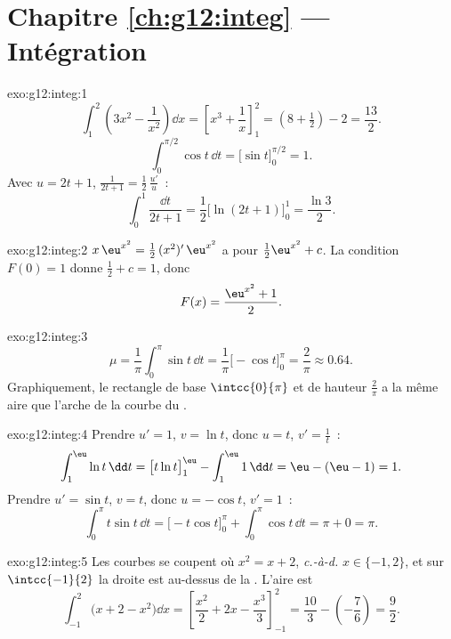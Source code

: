 \section*{Chapitre \ref{ch:g12:integ} --- Intégration}

\begin{solution}{exo:g12:integ:1}
\[
\int_1^2 \left(3x^2 - \frac{1}{x^2}\right)\dd x
= \left[x^3 + \frac1x\right]_1^2 = \left(8 + \tfrac12\right) - 2 = \frac{13}{2}.
\]
\[
\int_0^{\pi/2} \cos t\,\dd t = \bigl[\sin t\bigr]_0^{\pi/2} = 1 .
\]
Avec $u = 2t+1$, $\frac{1}{2t+1} = \frac12\,\frac{u'}{u}$~:
\[
\int_0^1 \frac{\dd t}{2t+1} = \frac12\bigl[\ln(2t+1)\bigr]_0^1
= \frac{\ln 3}{2}.
\]
\end{solution}

\begin{solution}{exo:g12:integ:2}
$x\,\eu^{x^2} = \frac12\,(x^2)'\,\eu^{x^2}$ a pour 
$\frac12\eu^{x^2} + c$. La condition $F(0) = 1$ donne $\frac12 + c = 1$,
donc
\[
F(x) = \frac{\eu^{x^2} + 1}{2}.
\]
\end{solution}

\begin{solution}{exo:g12:integ:3}
\[
\mu = \frac{1}{\pi}\int_0^\pi \sin t\,\dd t
= \frac{1}{\pi}\bigl[-\cos t\bigr]_0^\pi = \frac{2}{\pi} \approx 0.64 .
\]
Graphiquement, le rectangle de base $\intcc{0}{\pi}$ et de hauteur
$\frac{2}{\pi}$ a la même aire que l'arche de la courbe du .
\end{solution}

\begin{solution}{exo:g12:integ:4}
Prendre $u' = 1$, $v = \ln t$, donc $u = t$, $v' = \frac1t$~:
\[
\int_1^{\eu} \ln t\,\dd t = \bigl[t\ln t\bigr]_1^{\eu} - \int_1^{\eu} 1\,\dd t
= \eu - (\eu - 1) = 1 .
\]
Prendre $u' = \sin t$, $v = t$, donc $u = -\cos t$, $v' = 1$~:
\[
\int_0^\pi t\sin t\,\dd t = \bigl[-t\cos t\bigr]_0^\pi + \int_0^\pi \cos t\,\dd t
= \pi + 0 = \pi .
\]
\end{solution}

\begin{solution}{exo:g12:integ:5}
Les courbes se coupent où $x^2 = x + 2$, \emph{c.-à-d.} $x \in \{-1, 2\}$,
et sur $\intcc{-1}{2}$ la droite est au-dessus de la . L'aire est
\[
\int_{-1}^{2} \bigl(x + 2 - x^2\bigr)\dd x
= \left[\frac{x^2}{2} + 2x - \frac{x^3}{3}\right]_{-1}^{2}
= \frac{10}{3} - \left(-\frac{7}{6}\right) = \frac{9}{2}.
\]
\end{solution}

